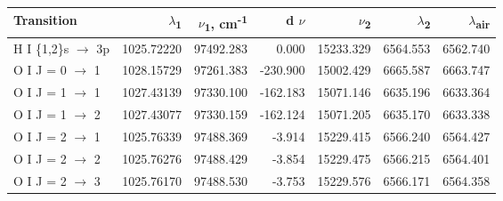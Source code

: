 \begin{tabular}{lrrrrrr}
Transition & \(\lambda\)\textsubscript{1} & \(\nu\)\textsubscript{1}, cm\textsuperscript{-1} & d \(\nu\) & \(\nu\)\textsubscript{2} & \(\lambda\)\textsubscript{2} & \(\lambda\)\textsubscript{air}\\
\hline
H I \{1,2\}s \(\to\) 3p & 1025.72220 & 97492.283 & 0.000 & 15233.329 & 6564.553 & 6562.740\\
O I J = 0 \(\to\) 1 & 1028.15729 & 97261.383 & -230.900 & 15002.429 & 6665.587 & 6663.747\\
O I J = 1 \(\to\) 1 & 1027.43139 & 97330.100 & -162.183 & 15071.146 & 6635.196 & 6633.364\\
O I J = 1 \(\to\) 2 & 1027.43077 & 97330.159 & -162.124 & 15071.205 & 6635.170 & 6633.338\\
O I J = 2 \(\to\) 1 & 1025.76339 & 97488.369 & -3.914 & 15229.415 & 6566.240 & 6564.427\\
O I J = 2 \(\to\) 2 & 1025.76276 & 97488.429 & -3.854 & 15229.475 & 6566.215 & 6564.401\\
O I J = 2 \(\to\) 3 & 1025.76170 & 97488.530 & -3.753 & 15229.576 & 6566.171 & 6564.358\\
\end{tabular}
